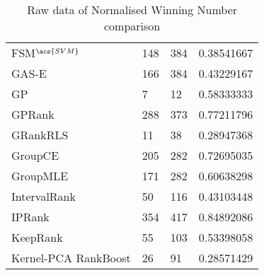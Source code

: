 \begin{table}
\begin{tabular}{l|l|l|l}
FSM$^{\acs{SVM}}$ & 148 & 384 & 0.38541667 \\ 
GAS-E & 166 & 384 & 0.43229167 \\ 
GP & 7 & 12 & 0.58333333 \\ 
GPRank & 288 & 373 & 0.77211796 \\ 
GRankRLS & 11 & 38 & 0.28947368 \\ 
GroupCE & 205 & 282 & 0.72695035 \\ 
GroupMLE & 171 & 282 & 0.60638298 \\ 
IntervalRank & 50 & 116 & 0.43103448 \\ 
IPRank & 354 & 417 & 0.84892086 \\ 
KeepRank & 55 & 103 & 0.53398058 \\ 
Kernel-PCA RankBoost & 26 &  91 & 0.28571429 \\ 
\end{tabular}
\caption{Raw data of Normalised Winning Number comparison}
\label{tab:raw_data_norm_winnum}
\end{table}

